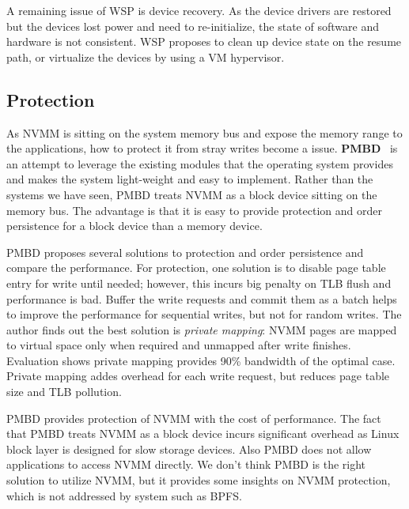A remaining issue of WSP is device recovery. As the device drivers are restored
but the devices lost power and need to re-initialize, the state of software
and hardware is not consistent. WSP proposes to clean up device state on
the resume path, or virtualize the devices by using a VM hypervisor.


\subsection{Protection} 
\label{sec:protection}

As NVMM is sitting on the system memory bus and expose the memory range
to the applications, how to protect it from stray writes become a issue.
\textbf{PMBD}~\cite{PMBD}
 is an attempt to leverage the existing modules that the 
operating system provides and makes the system light-weight and easy to
implement. Rather than the systems we have seen,
PMBD treats NVMM as a block device sitting on the memory bus. The advantage
is that it is easy to provide protection and order persistence for
a block device than a memory device.

PMBD proposes several solutions to protection and order persistence and
compare the performance. For protection, one solution is to disable page
table entry for write until needed; however, this incurs big penalty on
TLB flush and performance is bad. Buffer the write requests and commit
them as a batch helps to improve the performance for sequential writes,
but not for random writes. The author finds out the best solution is 
\emph{private mapping}: NVMM pages are mapped to virtual space only when
required and unmapped after write finishes. Evaluation shows private
mapping provides 90\% bandwidth of the optimal case. Private mapping
addes overhead for each write request, but reduces page table size and
TLB pollution.


PMBD provides protection of NVMM with the cost of performance.
The fact that
PMBD treats NVMM as a block device incurs significant overhead
as Linux block layer is designed for slow storage devices.
Also PMBD does not allow applications to access NVMM directly.
We don't think PMBD is the right solution to utilize NVMM, but it provides
some insights on NVMM protection, which is not addressed by system such as BPFS.

